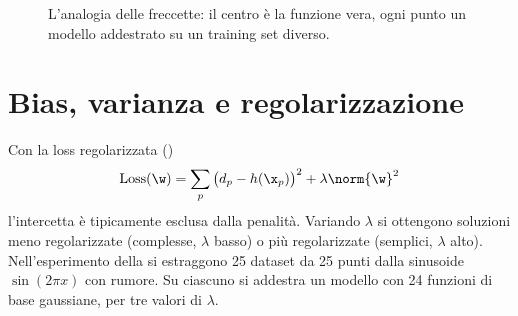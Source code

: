 \begin{figure}[ht]
\centering
{}
\caption{L'analogia delle freccette: il centro è la funzione vera, ogni punto un modello addestrato su un
training set diverso.}
\label{fig:freccette}
\end{figure}

\section{Bias, varianza e regolarizzazione}
\label{sec:bv-lambda}

Con la loss regolarizzata ()
\[
\mathrm{Loss}(\w) = \sum_p\big(d_p-h(\x_p)\big)^2 + \lambda\norm{\w}^2
\]
l'intercetta è tipicamente esclusa dalla penalità. Variando $\lambda$ si ottengono soluzioni meno regolarizzate
(complesse, $\lambda$ basso) o più regolarizzate (semplici, $\lambda$ alto). Nell'esperimento della
 si estraggono 25 dataset da 25 punti dalla sinusoide $\sin(2\pi x)$ con rumore. Su
ciascuno si addestra un modello con 24 funzioni di base gaussiane, per tre valori di $\lambda$.

